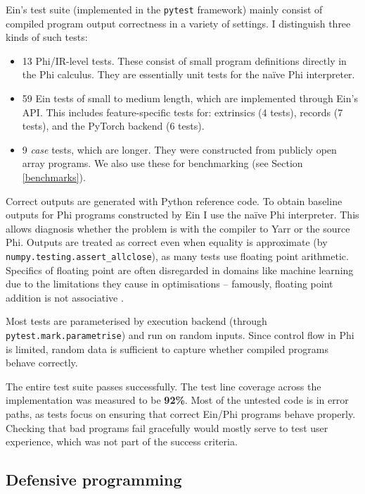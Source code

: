 Ein's test suite (implemented in the \texttt{pytest} framework) mainly consist of compiled program output correctness in a variety of settings. 
I distinguish three kinds of such tests:
\begin{itemize}
    \item 13 Phi/IR-level tests. These consist of small program definitions directly in the Phi calculus. They are essentially unit tests for the na\"ive Phi interpreter.
    \item 59 Ein tests of small to medium length, which are implemented through Ein's API. This includes feature-specific tests for: extrinsics (4 tests), records (7 tests), and the PyTorch backend (6 tests).
    \item 9 \textit{case} tests, which are longer. They were constructed from publicly open array programs. We also use these for benchmarking (see Section \ref{benchmarks}).
\end{itemize}

Correct outputs are generated with Python reference code.
To obtain baseline outputs for Phi programs constructed by Ein I use the na\"ive Phi interpreter.
This allows diagnosis whether the problem is with the compiler to Yarr or the source Phi.
Outputs are treated as correct even when equality is approximate (by \texttt{numpy.testing.assert\_allclose}), as many tests use floating point arithmetic. 
Specifics of floating point are often disregarded in domains like machine learning due to the limitations they cause in optimisations -- famously, floating point addition is not associative \cite{alawi2004every}.

Most tests are parameterised by execution backend (through \texttt{pytest.mark.parametrise}) and run on random inputs. Since control flow in Phi is limited, random data is sufficient to capture whether compiled programs behave correctly. 

The entire test suite passes successfully. The test line coverage across the implementation was measured to be \textbf{92\%}. Most of the untested code is in error paths, as tests focus on ensuring that correct Ein/Phi programs behave properly.
Checking that bad programs fail gracefully would mostly serve to test user experience, which was not part of the success criteria.

\subsection{Defensive programming}

